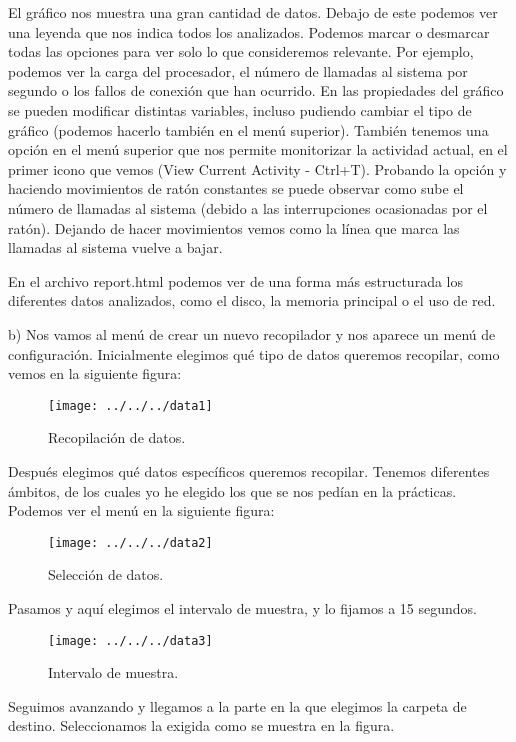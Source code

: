 \documentclass[a4paper, 11pt]{article} %
\begin{document}
El gráfico nos muestra una gran cantidad de datos. Debajo de este podemos ver una leyenda que nos indica todos los analizados. Podemos marcar o desmarcar todas las opciones para ver solo lo que consideremos relevante. Por ejemplo, podemos ver la carga del procesador, el número de llamadas al sistema por segundo o los fallos de conexión que han ocurrido. En las propiedades del gráfico se pueden modificar distintas variables, incluso pudiendo cambiar el tipo de gráfico (podemos hacerlo también en el menú superior). También tenemos una opción en el menú superior que nos permite monitorizar la actividad actual, en el primer icono que vemos (View Current Activity - Ctrl+T). Probando la opción y haciendo movimientos de ratón constantes se puede observar como sube el número de llamadas al sistema (debido a las interrupciones ocasionadas por el ratón). Dejando de hacer movimientos vemos como la línea que marca las llamadas al sistema vuelve a bajar. 

En el archivo report.html podemos ver de una forma más estructurada los diferentes datos analizados, como el disco, la memoria principal o el uso de red. 

b) Nos vamos al menú de crear un nuevo recopilador y nos aparece un menú de configuración. Inicialmente elegimos qué tipo de datos queremos recopilar, como vemos en la siguiente figura: 

\begin{figure}[htpb]
\centering
\texttt{[image: ../../../data1]}
\caption{Recopilación de datos.}
\end{figure}

Después elegimos qué datos específicos queremos recopilar. Tenemos diferentes ámbitos, de los cuales yo he elegido los que se nos pedían en la prácticas. Podemos ver el menú en la siguiente figura: 

\begin{figure}[htpb]
\centering
\texttt{[image: ../../../data2]}
\caption{Selección de datos.}
\end{figure}

Pasamos y aquí elegimos el intervalo de muestra, y lo fijamos a 15 segundos. 

\begin{figure}[htpb]
\centering
\texttt{[image: ../../../data3]}
\caption{Intervalo de muestra.}
\end{figure}

Seguimos avanzando y llegamos a la parte en la que elegimos la carpeta de destino. Seleccionamos la exigida como se muestra en la figura. 
\end{document}
